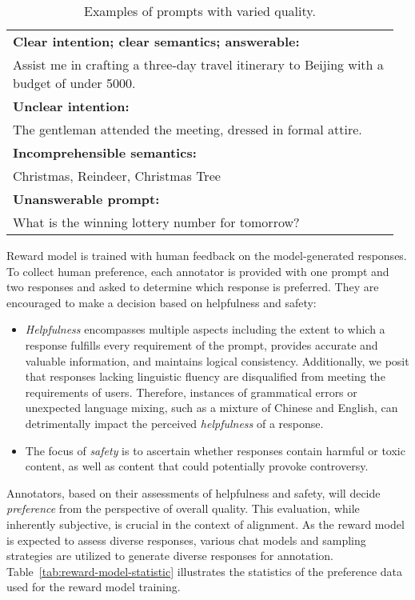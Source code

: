 \begin{table}[]
\centering
\caption{Examples of prompts with varied quality.}
\begin{tabular}{p{0.96\linewidth}}
\toprule[1.2pt]
\textbf{Clear intention; clear semantics; answerable:}                                            \\
Assist me in crafting a three-day travel itinerary to Beijing with a budget of under 5000. \\ \hline
\textbf{Unclear intention:}                                                                       \\
The gentleman attended the meeting, dressed in formal attire.                        \\ \hline
\textbf{Incomprehensible semantics:}                                                             \\
Christmas, Reindeer, Christmas Tree                                                        \\ \hline
\textbf{Unanswerable prompt:}                                                                              \\
What is the winning lottery number for tomorrow? \\ 
\bottomrule[1.2pt]
\end{tabular}
\label{tab:prompt-quality-category}
\end{table}

Reward model is trained with human feedback on the model-generated responses.
To collect human preference, each annotator is provided with one prompt and two responses and asked to determine which response is preferred. They are encouraged to make a decision based on 
helpfulness and safety:
\begin{itemize}[leftmargin=*]
    \item \textit{Helpfulness} encompasses multiple aspects including the extent to which a response fulfills every requirement of the prompt, provides accurate and valuable information, and maintains logical consistency. Additionally, we posit that responses lacking linguistic fluency are disqualified from meeting the requirements of users. Therefore, instances of grammatical errors or unexpected language mixing, such as a mixture of Chinese and English, can detrimentally impact the perceived \textit{helpfulness} of a response.
    \item The focus of \textit{safety} is to ascertain whether responses contain harmful or toxic content, as well as content that could potentially provoke controversy.
\end{itemize}
Annotators, based on their assessments of helpfulness and safety, will decide \textit{preference} from the perspective of overall quality. This evaluation, while inherently subjective, is crucial in the context of alignment. As the reward model is expected to assess diverse responses, various chat models and sampling strategies are utilized to generate diverse responses for annotation.
Table~\ref{tab:reward-model-statistic} illustrates the statistics of the preference data used for the reward model training.

